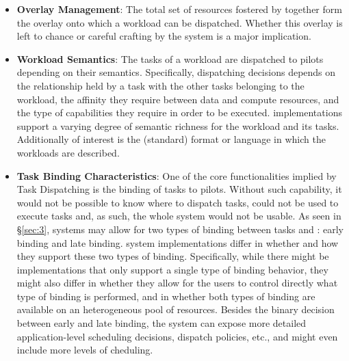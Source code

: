 \documentclass{sig-alternate}
\begin{document}
\begin{itemize}

\item \textbf{Overlay Management}: The total set of resources fostered by
  \pilots together form the overlay onto which a workload can be dispatched.
  Whether this overlay is left to chance or careful crafting by the \pilot
  system is a major implication.


\item \textbf{Workload Semantics}: The tasks of a workload are dispatched to
  pilots depending on their semantics. Specifically, dispatching decisions
  depends on the relationship held by a task with the other tasks belonging to
  the workload, the affinity they require between data and compute resources,
  and the type of capabilities they require in order to be executed. \pilot
  implementations support a varying degree of semantic richness for the
  workload and its tasks.  Additionally of interest is the (standard) format or
  language in which the workloads are described.

\item \textbf{Task Binding Characteristics}: One of the core functionalities
  implied by Task Dispatching is the binding of tasks to pilots. Without such
  capability, it would not be possible to know where to dispatch tasks, \pilots
  could not be used to execute tasks and, as such, the whole \pilot system
  would not be usable. As seen in \S\ref{sec:3}, \pilot systems may allow for
  two types of binding between tasks and \pilots: early binding and late
  binding. \pilot system implementations differ in whether and how they support
  these two types of binding. Specifically, while there might be
  implementations that only support a single type of binding behavior, they
  might also differ in whether they allow for the users to control directly
  what type of binding is performed, and in whether both types of binding are
  available on an heterogeneous pool of resources.
  Besides the binary decision between early and late binding, the \pilot system
  can expose more detailed application-level scheduling decisions, dispatch
  policies, etc., and might even include more levels of cheduling.


\end{itemize}
\end{document}
